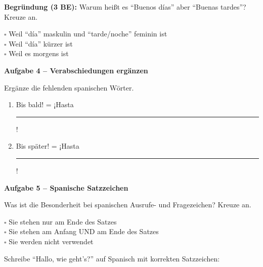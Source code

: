 \documentclass[11pt, a4paper]{article}
\newcommand{\punktebox}[1]{\hfill\fbox{\small \_\_\_/#1}}
\newcommand{\luecke}[1]{\rule{#1}{0.4pt}}
\begin{document}
\noindent \textbf{Begründung (3 BE):} Warum heißt es ``Buenos días'' aber ``Buenas tardes''? Kreuze an.

\vspace{5pt}

\noindent
$\square$ Weil ``día'' maskulin und ``tarde/noche'' feminin ist \\
$\square$ Weil ``día'' kürzer ist \\
$\square$ Weil es morgens ist

\vspace{15pt}


\noindent\textbf{\textcolor{spanisch}{Aufgabe 4 -- Verabschiedungen ergänzen}} \punktebox{4}

\noindent Ergänze die fehlenden spanischen Wörter.

\vspace{10pt}

\begin{enumerate}[label=\alph*)]
    \item Bis bald! = ¡Hasta \luecke{3cm}!
    \item Bis später! = ¡Hasta \luecke{3cm}!
\end{enumerate}

\vspace{15pt}


\noindent\textbf{\textcolor{spanisch}{Aufgabe 5 -- Spanische Satzzeichen}} \punktebox{4}

\noindent Was ist die Besonderheit bei spanischen Ausrufe- und Fragezeichen? Kreuze an.

\vspace{5pt}

\noindent
$\square$ Sie stehen nur am Ende des Satzes \\
$\square$ Sie stehen am Anfang UND am Ende des Satzes \\
$\square$ Sie werden nicht verwendet

\vspace{10pt}

\noindent Schreibe ``Hallo, wie geht's?'' auf Spanisch mit korrekten Satzzeichen:
\end{document}
